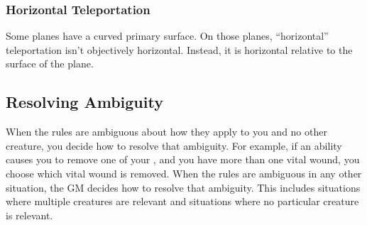         \subsubsection{Horizontal Teleportation}
            Some planes have a curved primary surface.
            On those planes, ``horizontal'' teleportation isn't objectively horizontal.
            Instead, it is horizontal relative to the surface of the plane.

    \subsection{Resolving Ambiguity}\label{Resolving Ambiguity}
        When the rules are ambiguous about how they apply to you and no other creature, you decide how to resolve that ambiguity.
        For example, if an ability causes you to remove one of your , and you have more than one vital wound, you choose which vital wound is removed.
        When the rules are ambiguous in any other situation, the GM decides how to resolve that ambiguity.
        This includes situations where multiple creatures are relevant and situations where no particular creature is relevant.
